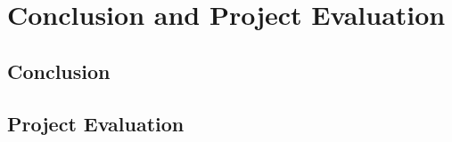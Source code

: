 \chapter{Conclusion and Project Evaluation}
\label{chapter11}

\section{Conclusion}
\section{Project Evaluation}
